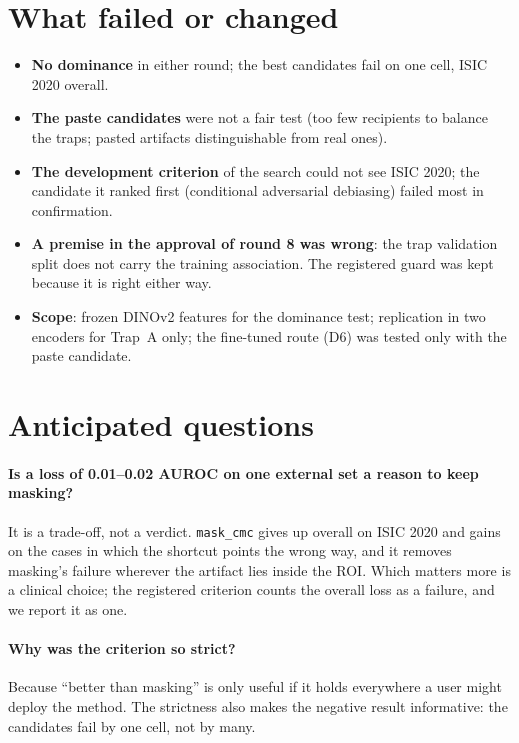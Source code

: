 \section{What failed or changed}
\begin{itemize}[leftmargin=*]\itemsep1pt
\item \textbf{No dominance} in either round; the best candidates fail on one cell, ISIC 2020 overall.
\item \textbf{The paste candidates} were not a fair test (too few recipients to balance the traps; pasted artifacts
distinguishable from real ones).
\item \textbf{The development criterion} of the search could not see ISIC 2020; the candidate it ranked first (conditional
adversarial debiasing) failed most in confirmation.
\item \textbf{A premise in the approval of round 8 was wrong}: the trap validation split does not carry the training
association. The registered guard was kept because it is right either way.
\item \textbf{Scope}: frozen DINOv2 features for the dominance test; replication in two encoders for Trap~A only; the
fine-tuned route (D6) was tested only with the paste candidate.
\end{itemize}

\section{Anticipated questions}
\paragraph{Is a loss of 0.01--0.02 AUROC on one external set a reason to keep masking?} It is a trade-off, not a
verdict. \texttt{mask\_cmc} gives up \sNineCmcDOneallisicTwoZeroTwoZero{} overall on ISIC 2020 and gains
\sNineCmcDTwohardisicTwoZeroTwoZero{} on the cases in which the shortcut points the wrong way, and it removes masking's
failure wherever the artifact lies inside the ROI. Which matters more is a clinical choice; the registered criterion
counts the overall loss as a failure, and we report it as one.
\paragraph{Why was the criterion so strict?} Because ``better than masking'' is only useful if it holds everywhere a user
might deploy the method. The strictness also makes the negative result informative: the candidates fail by one cell, not
by many.
